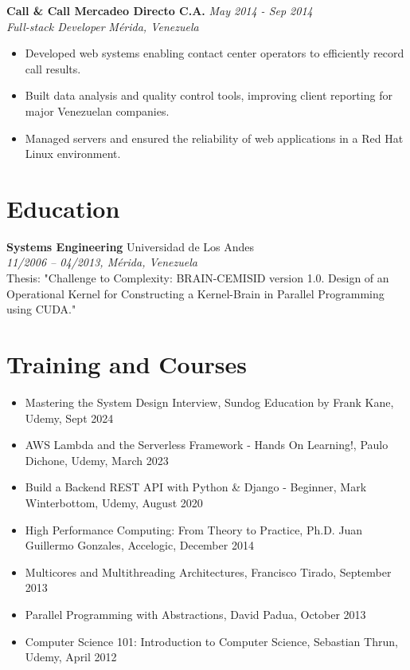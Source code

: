 \documentclass[a4paper,10pt]{article}
\begin{document}
\textbf{Call \& Call Mercadeo Directo C.A.} \hfill \textit{May 2014 - Sep 2014} \\
\textit{Full-stack Developer} \hfill \textit{Mérida, Venezuela} \\
\begin{itemize}[leftmargin=0.5cm, topsep=0pt, parsep=0pt, itemsep=2pt]
    \item Developed web systems enabling contact center operators to efficiently record call results.
    \item Built data analysis and quality control tools, improving client reporting for major Venezuelan companies.
    \item Managed servers and ensured the reliability of web applications in a Red Hat Linux environment.
\end{itemize}

\section*{Education}
\sectionline
\textbf{Systems Engineering} \hfill Universidad de Los Andes \\
\textit{11/2006 -- 04/2013, Mérida, Venezuela} \\
Thesis: "Challenge to Complexity: BRAIN-CEMISID version 1.0. Design of an Operational Kernel for Constructing a Kernel-Brain in Parallel Programming using CUDA."

\section*{Training and Courses}
\sectionline
\begin{itemize}[leftmargin=0.5cm, topsep=0pt, parsep=0pt, itemsep=2pt]
    \item Mastering the System Design Interview, Sundog Education by Frank Kane, Udemy, Sept 2024
    \item AWS Lambda and the Serverless Framework - Hands On Learning!, Paulo Dichone, Udemy, March 2023
    \item Build a Backend REST API with Python \& Django - Beginner, Mark Winterbottom, Udemy, August 2020
    \item High Performance Computing: From Theory to Practice, Ph.D. Juan Guillermo Gonzales, Accelogic, December 2014
    \item Multicores and Multithreading Architectures, Francisco Tirado, September 2013
    \item Parallel Programming with Abstractions, David Padua, October 2013
    \item Computer Science 101: Introduction to Computer Science, Sebastian Thrun, Udemy, April 2012
\end{itemize}
\end{document}

